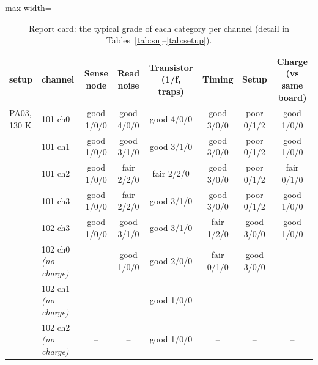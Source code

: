 \begin{table}[H]\centering\small
\caption{Report card: the typical grade of each category per channel (detail in Tables~\ref{tab:sn}--\ref{tab:setup}).}\label{tab:card}
\begin{adjustbox}{max width=\linewidth}
\begin{tabular}{llcccccc}\toprule
setup & channel & Sense node & Read noise & Transistor (1/f, traps) & Timing & Setup & Charge (vs same board)\\\midrule
PA03, 130 K & 101 ch0 & \cellcolor{good}good \scriptsize{1/0/0} & \cellcolor{good}good \scriptsize{4/0/0} & \cellcolor{good}good \scriptsize{4/0/0} & \cellcolor{good}good \scriptsize{3/0/0} & \cellcolor{poor}poor \scriptsize{0/1/2} & \cellcolor{good}good \scriptsize{1/0/0}\\
 & 101 ch1 & \cellcolor{good}good \scriptsize{1/0/0} & \cellcolor{good}good \scriptsize{3/1/0} & \cellcolor{good}good \scriptsize{3/1/0} & \cellcolor{good}good \scriptsize{3/0/0} & \cellcolor{poor}poor \scriptsize{0/1/2} & \cellcolor{good}good \scriptsize{1/0/0}\\
 & 101 ch2 & \cellcolor{good}good \scriptsize{1/0/0} & \cellcolor{fair}fair \scriptsize{2/2/0} & \cellcolor{fair}fair \scriptsize{2/2/0} & \cellcolor{good}good \scriptsize{3/0/0} & \cellcolor{poor}poor \scriptsize{0/1/2} & \cellcolor{fair}fair \scriptsize{0/1/0}\\
 & 101 ch3 & \cellcolor{good}good \scriptsize{1/0/0} & \cellcolor{fair}fair \scriptsize{2/2/0} & \cellcolor{good}good \scriptsize{3/1/0} & \cellcolor{good}good \scriptsize{3/0/0} & \cellcolor{poor}poor \scriptsize{0/1/2} & \cellcolor{good}good \scriptsize{1/0/0}\\
 & 102 ch3 & \cellcolor{good}good \scriptsize{1/0/0} & \cellcolor{good}good \scriptsize{3/1/0} & \cellcolor{good}good \scriptsize{3/1/0} & \cellcolor{fair}fair \scriptsize{1/2/0} & \cellcolor{good}good \scriptsize{3/0/0} & \cellcolor{good}good \scriptsize{1/0/0}\\
 & 102 ch0 \textit{(no charge)} & -- & \cellcolor{good}good \scriptsize{1/0/0} & \cellcolor{good}good \scriptsize{2/0/0} & \cellcolor{fair}fair \scriptsize{0/1/0} & \cellcolor{good}good \scriptsize{3/0/0} & --\\
 & 102 ch1 \textit{(no charge)} & -- & -- & \cellcolor{good}good \scriptsize{1/0/0} & -- & -- & --\\
 & 102 ch2 \textit{(no charge)} & -- & -- & \cellcolor{good}good \scriptsize{1/0/0} & -- & -- & --\\
\midrule

\end{tabular}
\end{adjustbox}
\end{table}
